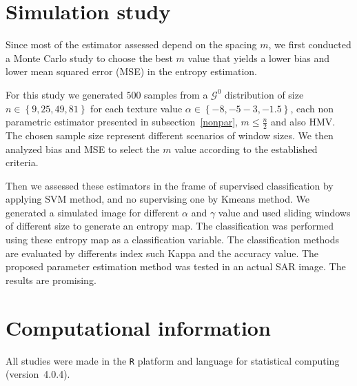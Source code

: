 \documentclass[journal]{IEEEtran}
\begin{document}
\section{Simulation study}\label{simulation}

Since most of the estimator assessed depend on the spacing $m$, we first conducted a Monte Carlo study  to choose the best $m$ value that yields a lower bias and lower mean squared error (MSE) in the entropy estimation. %

For this study we generated $500$ samples from a $\mathcal{G}^0$ distribution of size $n \in\left\lbrace 9,25,49,81\right\rbrace $ for each texture value $\alpha \in\left\lbrace -8,-5-3,-1.5\right\rbrace $, each non parametric estimator presented in subsection~\eqref{nonpar}, $m \leq \frac{n}{2}$ and also HMV. The chosen sample size represent different scenarios of window sizes. We then analyzed bias and MSE to select the $m$ value according to the established criteria. 

Then we assessed these estimators in the frame of supervised classification by applying SVM method, and no supervising one by Kmeans method. We generated a simulated image for different $\alpha$ and $\gamma$ value and used sliding windows of different size to generate an entropy map. The classification was performed using these entropy map as a classification variable. The classification methods are evaluated by differents index such Kappa and the accuracy value. The proposed parameter estimation method was tested in an
actual SAR image. The results are promising.






\section{Computational information}
\label{conclusion}



All studies were made in the \texttt R platform and language for statistical computing~\cite{RLanguage} (version~4.0.4).




\end{document}
